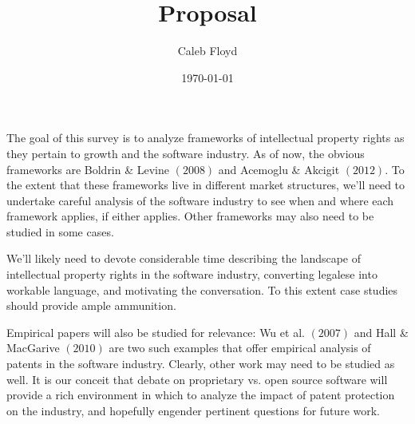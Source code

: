\documentclass[11pt]{article}
\title{Proposal}
\author{Caleb Floyd}
\date{\today}
\begin{document}
\maketitle

The goal of this survey is to analyze frameworks of intellectual property rights as they pertain to growth and the software industry. As of now, the obvious frameworks are Boldrin \& Levine $(2008)$ and Acemoglu \& Akcigit $(2012)$. To the extent that these frameworks live in different market structures, we'll need to undertake careful analysis of the software industry to see when and where each framework applies, if either applies. Other frameworks may also need to be studied in some cases. 

We'll likely need to devote considerable time describing the landscape of intellectual property rights in the software industry, converting legalese into workable language, and motivating the conversation. To this extent case studies should provide ample ammunition. 

Empirical papers will also be studied for relevance: Wu et al. $(2007)$ and Hall \& MacGarive $(2010)$ are two such examples that offer empirical analysis of patents in the software industry. Clearly, other work may need to be studied as well. It is our conceit that debate on proprietary vs. open source software will provide a rich environment in which to analyze the impact of patent protection on the industry, and hopefully engender pertinent questions for future work. 
\end{document}
